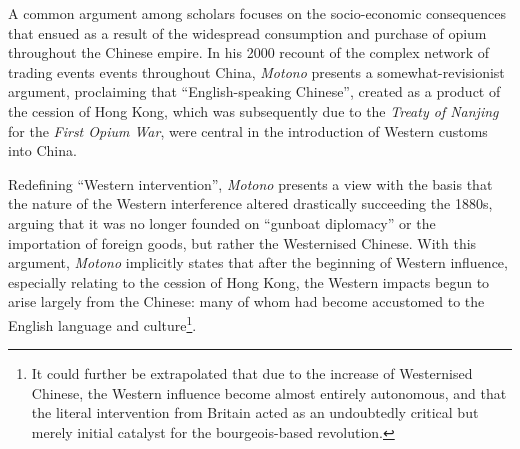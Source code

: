 \documentclass[a4paper,oneside]{article}
\begin{document}
        A common argument among scholars focuses on the socio-economic consequences that ensued as a result of the widespread consumption and purchase of opium throughout the Chinese empire. In his 2000 recount of the complex network of trading events events throughout China, \textit{Motono} presents a somewhat-revisionist argument, proclaiming that ``English-speaking Chinese'', created as a product of the cession of Hong Kong, which was subsequently due to the \textit{Treaty of Nanjing} for the \textit{First Opium War}, were central in the introduction of Western customs into China.

        Redefining ``Western intervention'', \textit{Motono} presents a view with the basis that the nature of the Western interference altered drastically succeeding the 1880s, arguing that it was no longer founded on ``gunboat diplomacy'' or the importation of foreign goods, but rather the Westernised Chinese. With this argument, \textit{Motono} implicitly states that after the beginning of Western influence, especially relating to the cession of Hong Kong, the Western impacts begun to arise largely from the Chinese: many of whom had become accustomed to the English language and culture\footnote{It could further be extrapolated that due to the increase of Westernised Chinese, the Western influence become almost entirely autonomous, and that the literal intervention from Britain acted as an undoubtedly critical but merely initial catalyst for the bourgeois-based revolution.}.

\end{document}
